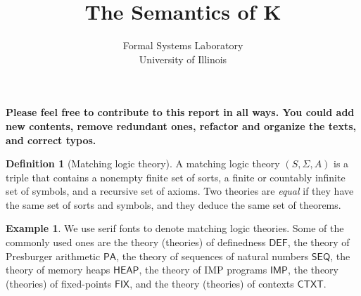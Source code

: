 \documentclass{article}
\title{The Semantics of K}
\author{Formal Systems Laboratory \\
          University of Illinois}
\newcommand{\comment}[1]
    {\par {\bfseries \color{blue} #1 \par}} %
\newcounter{thmcounter}
\theoremstyle{plain}
\theoremstyle{definition}
\newtheorem{definition}[thmcounter]{Definition}
\newtheorem{example}[thmcounter]{Example}
\theoremstyle{remark}
\newcommand{\PA}{\mathsf{PA}}
\newcommand{\SEQ}{\mathsf{SEQ}}
\newcommand{\HEAP}{\mathsf{HEAP}}
\newcommand{\IMP}{\mathsf{IMP}}
\newcommand{\FIX}{\mathsf{FIX}}
\newcommand{\CTXT}{\mathsf{CTXT}}
\newcommand{\DEF}{\mathsf{DEF}}
\begin{document}
\maketitle

\comment{Please feel free to contribute to this report in all ways. You could add new contents, remove redundant ones, refactor and organize the texts, and correct typos.} 

\begin{definition}[Matching logic theory]
\label{ML_theory}
A matching logic theory $(S, \Sigma, A)$ is a triple that contains a nonempty finite set of sorts, a finite or countably infinite set of symbols, and a recursive set of axioms. Two theories are \emph{equal} if they have the same set of sorts and symbols, and they deduce the same set of theorems.
\end{definition}

\begin{example}
We use {\sf serif fonts} to denote matching logic theories. Some of the commonly used ones are the theory (theories) of definedness $\DEF$, the theory of Presburger arithmetic $\PA$, the theory of sequences of natural numbers $\SEQ$, the theory of memory heaps $\HEAP$, the theory of {IMP} programs $\IMP$, the theory (theories) of fixed-points $\FIX$, and the theory (theories) of contexts $\CTXT$.
\end{example}
\end{document}
